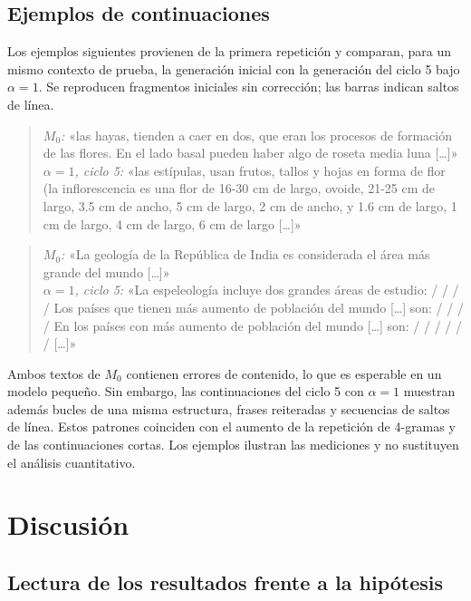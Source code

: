 \documentclass[12pt,letterpaper]{article}
\begin{document}
\subsection{Ejemplos de continuaciones}

Los ejemplos siguientes provienen de la primera repetición y comparan, para
un mismo contexto de prueba, la generación inicial con la generación del
ciclo 5 bajo \(\alpha=1\). Se reproducen fragmentos iniciales sin
corrección; las barras indican saltos de línea.

\begin{quote}\small
\textit{\(M_0\):} «las hayas, tienden a caer en dos, que eran los procesos
de formación de las flores. En el lado basal pueden haber algo de roseta
media luna [\ldots]»\\[0.3em]
\textit{\(\alpha=1\), ciclo 5:} «las estípulas, usan frutos, tallos y hojas
en forma de flor (la inflorescencia es una flor de 16-30 cm de largo,
ovoide, 21-25 cm de largo, 3.5 cm de ancho, 5 cm de largo, 2 cm de ancho,
y 1.6 cm de largo, 1 cm de largo, 4 cm de largo, 6 cm de largo [\ldots]»
\end{quote}

\begin{quote}\small
\textit{\(M_0\):} «La geología de la República de India es considerada el
área más grande del mundo [\ldots]»\\[0.3em]
\textit{\(\alpha=1\), ciclo 5:} «La espeleología incluye dos grandes áreas
de estudio: / / / / Los países que tienen más aumento de población del mundo
[\ldots] son: / / / / En los países con más aumento de población del mundo
[\ldots] son: / / / / / / [\ldots]»
\end{quote}

Ambos textos de \(M_0\) contienen errores de contenido, lo que es esperable
en un modelo pequeño. Sin embargo, las continuaciones del ciclo 5 con
\(\alpha=1\) muestran además bucles de una misma estructura, frases
reiteradas y secuencias de saltos de línea. Estos patrones coinciden con
el aumento de la repetición de 4-gramas y de las continuaciones cortas.
Los ejemplos ilustran las mediciones y no sustituyen el análisis
cuantitativo.

\section{Discusión}

\subsection{Lectura de los resultados frente a la hipótesis}
\end{document}
